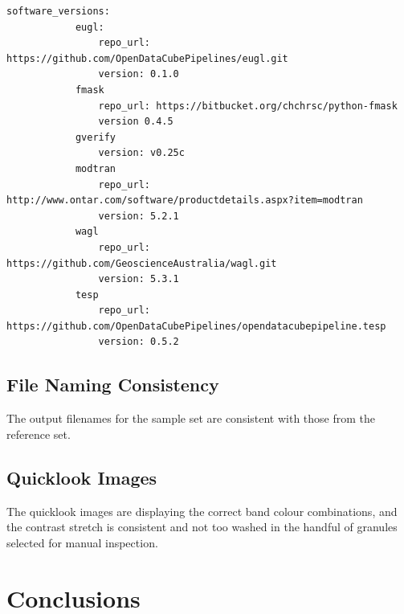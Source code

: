\documentclass[a4paper]{article}
\begin{document}
      \begin{lstlisting}[breaklines=true]
        software_versions:
            eugl:
                repo_url: https://github.com/OpenDataCubePipelines/eugl.git
                version: 0.1.0
            fmask
                repo_url: https://bitbucket.org/chchrsc/python-fmask
                version 0.4.5
            gverify
                version: v0.25c
            modtran
                repo_url: http://www.ontar.com/software/productdetails.aspx?item=modtran
                version: 5.2.1
            wagl
                repo_url: https://github.com/GeoscienceAustralia/wagl.git
                version: 5.3.1
            tesp
                repo_url: https://github.com/OpenDataCubePipelines/opendatacubepipeline.tesp
                version: 0.5.2
      \end{lstlisting}

    \subsection{File Naming Consistency}

      \begin{flushleft}
        The output filenames for the sample set are consistent with those from the reference set.
      \end{flushleft}

    \subsection{Quicklook Images}

      \begin{flushleft}
        The quicklook images are displaying the correct band colour combinations, and the contrast stretch is consistent and not too washed in the handful of granules selected for manual inspection.
      \end{flushleft}

  \clearpage

  \section{Conclusions}
\end{document}
